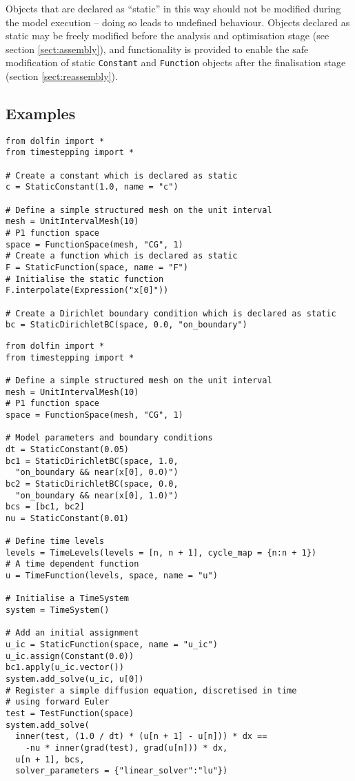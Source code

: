 \documentclass[a4paper]{book}
\begin{document}
Objects that are declared as ``static'' in this way should not be modified
during the model execution -- doing so leads to undefined behaviour. Objects
declared as static may be freely modified before the analysis and optimisation
stage (see section \ref{sect:assembly}), and functionality is provided to enable
the safe modification of static \verb+Constant+ and \verb+Function+ objects
after the finalisation stage (section \ref{sect:reassembly}).

\subsection*{Examples}

\begin{lstlisting}
from dolfin import *
from timestepping import *

# Create a constant which is declared as static
c = StaticConstant(1.0, name = "c")

# Define a simple structured mesh on the unit interval
mesh = UnitIntervalMesh(10)
# P1 function space
space = FunctionSpace(mesh, "CG", 1)
# Create a function which is declared as static
F = StaticFunction(space, name = "F")
# Initialise the static function
F.interpolate(Expression("x[0]"))

# Create a Dirichlet boundary condition which is declared as static
bc = StaticDirichletBC(space, 0.0, "on_boundary")
\end{lstlisting}

\begin{lstlisting}
from dolfin import *
from timestepping import *

# Define a simple structured mesh on the unit interval
mesh = UnitIntervalMesh(10)
# P1 function space
space = FunctionSpace(mesh, "CG", 1)

# Model parameters and boundary conditions
dt = StaticConstant(0.05)
bc1 = StaticDirichletBC(space, 1.0,
  "on_boundary && near(x[0], 0.0)")
bc2 = StaticDirichletBC(space, 0.0,
  "on_boundary && near(x[0], 1.0)")
bcs = [bc1, bc2]
nu = StaticConstant(0.01)

# Define time levels
levels = TimeLevels(levels = [n, n + 1], cycle_map = {n:n + 1})
# A time dependent function
u = TimeFunction(levels, space, name = "u")

# Initialise a TimeSystem
system = TimeSystem()

# Add an initial assignment
u_ic = StaticFunction(space, name = "u_ic")
u_ic.assign(Constant(0.0))
bc1.apply(u_ic.vector())
system.add_solve(u_ic, u[0])
# Register a simple diffusion equation, discretised in time
# using forward Euler
test = TestFunction(space)
system.add_solve(
  inner(test, (1.0 / dt) * (u[n + 1] - u[n])) * dx ==
    -nu * inner(grad(test), grad(u[n])) * dx,
  u[n + 1], bcs,
  solver_parameters = {"linear_solver":"lu"})
\end{lstlisting}
\end{document}
